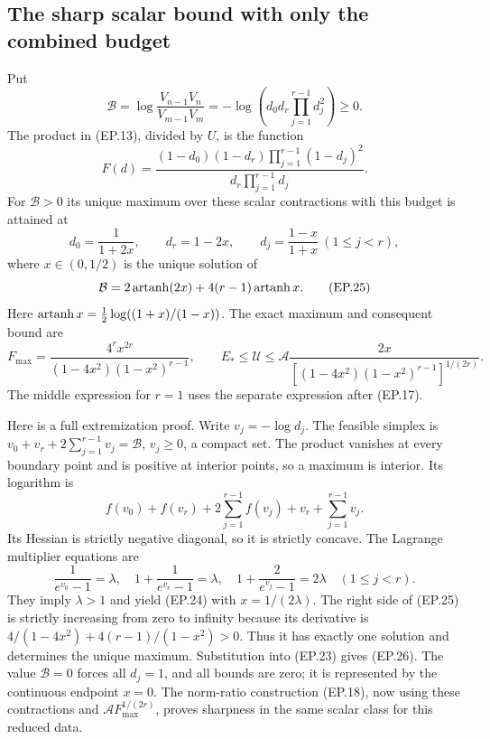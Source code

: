\subsection{The sharp scalar bound with only the combined budget}
Put
\[
 \mathcal B=\log\frac{V_{n-1}V_n}{V_{m-1}V_m}
 =-\log\left(d_0d_r\prod_{j=1}^{r-1}d_j^2\right)\ge0.
\tag{EP.22}
\]
The product in (EP.13), divided by $U$, is the function
\[
 F(d)=\frac{(1-d_0)(1-d_r)\prod_{j=1}^{r-1}(1-d_j)^2}
 {d_r\prod_{j=1}^{r-1}d_j}.
\tag{EP.23}
\]
For $\mathcal B>0$ its unique maximum over these scalar contractions
with this budget is attained at
\[
 d_0=\frac1{1+2x},\qquad d_r=1-2x,\qquad
 d_j=\frac{1-x}{1+x}\ (1\le j<r),\tag{EP.24}
\]
where $x\in(0,1/2)$ is the unique solution of
\[
 \mathcal B=2\operatorname{artanh}(2x)+4(r-1)\operatorname{artanh} x.
\tag{EP.25}
\]
Here $\operatorname{artanh} x=\tfrac12\log((1+x)/(1-x))$.
The exact maximum and consequent bound are
\[
 F_{\max}=\frac{4^r x^{2r}}{(1-4x^2)(1-x^2)^{r-1}},\qquad
 \boxed{E_*\le\mathcal U\le
 \mathcal A\frac{2x}{[(1-4x^2)(1-x^2)^{r-1}]^{1/(2r)}}.}
\tag{EP.26}
\]
The middle expression for $r=1$ uses the separate expression after
(EP.17).

Here is a full extremization proof. Write $v_j=-\log d_j$.
The feasible simplex is $v_0+v_r+2\sum_{j=1}^{r-1}v_j=\mathcal B$,
$v_j\ge0$, a compact set. The product vanishes at every boundary
point and is positive at interior points, so a maximum is interior.
Its logarithm is
\[
 f(v_0)+f(v_r)+2\sum_{j=1}^{r-1}f(v_j)
                 +v_r+\sum_{j=1}^{r-1}v_j.
\tag{EP.27}
\]
Its Hessian is strictly negative diagonal, so it is strictly concave.
The Lagrange multiplier equations are
\[
 \frac1{e^{v_0}-1}=\lambda,\quad
 1+\frac1{e^{v_r}-1}=\lambda,\quad
 1+\frac2{e^{v_j}-1}=2\lambda\quad(1\le j<r).
\tag{EP.28}
\]
They imply $\lambda>1$ and yield (EP.24) with $x=1/(2\lambda)$.
The right side of (EP.25) is strictly increasing from zero to
infinity because its derivative is
$4/(1-4x^2)+4(r-1)/(1-x^2)>0$.
Thus it has exactly one solution and determines the unique maximum.
Substitution into (EP.23) gives (EP.26). The value $\mathcal B=0$
forces all $d_j=1$, and all bounds are zero; it is represented by
the continuous endpoint $x=0$. The norm-ratio construction (EP.18),
now using these contractions and $\mathcal A F_{\max}^{1/(2r)}$,
proves sharpness in the same scalar class for this reduced data.


